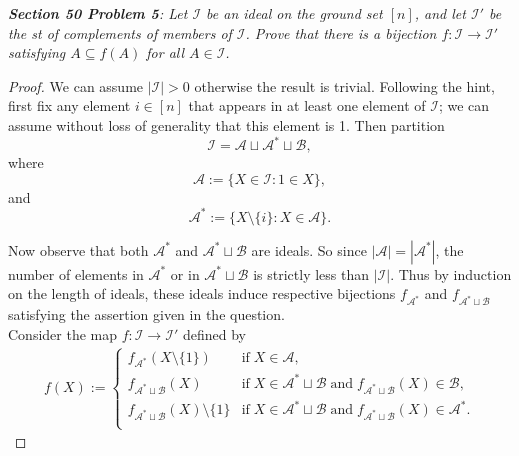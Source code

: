 \documentclass{article}
\begin{document}
\it \textbf{Section 50 Problem 5}: Let $\mathcal{I}$ be an ideal on the
  ground set $[n]$, and let $\mathcal{I}'$ be the st of complements of
  members of $\mathcal{I}$. Prove that there is a bijection
  $f:\mathcal{I}\rightarrow\mathcal{I}'$ satisfying $A\subseteq f(A)$ for
  all $A\in\mathcal{I}$.

  \begin{proof}
    We can assume $|\mathcal{I}|>0$ otherwise the result is trivial.
    Following the hint, first fix any element $i\in[n]$ that appears in at
    least one element of $\mathcal{I}$; we can assume without loss of
    generality that this element is 1. Then partition
    \[\mathcal{I}=\mathcal{A}\sqcup\mathcal{A}^*\sqcup\mathcal{B},\]
    where
    \[\mathcal{A} :=\{X\in\mathcal{I}: 1\in X\},\]
    and
    \[\mathcal{A}^* :=\{X\setminus\{i\}: X\in\mathcal{A}\}.\]

    Now observe that both $\mathcal{A}^*$ and
    $\mathcal{A}^*\sqcup\mathcal{B}$ are ideals. So since
    $|\mathcal{A}|=|\mathcal{A}^*|$, the number of elements in
    $\mathcal{A}^*$ or in $\mathcal{A}^*\sqcup\mathcal{B}$ is strictly less
    than $|\mathcal{I}|$. Thus by induction on the length of ideals, these
    ideals induce respective bijections $f_{\mathcal{A}^*}$ and
    $f_{\mathcal{A}^*\sqcup\mathcal{B}}$ satisfying the assertion given in
    the question. \\


    Consider the map $f:\mathcal{I}\rightarrow\mathcal{I}'$ defined by
    \begin{align*}
      f(X) :=
      \begin{cases}
        f_{\mathcal{A}^*}(X\setminus\{1\}) &\text{if}\; X\in \mathcal{A},\\
        f_{\mathcal{A}^*\sqcup\mathcal{B}}(X) &\text{if}\; X\in
          \mathcal{A}^*\sqcup\mathcal{B}\; \text{and}\;
          f_{\mathcal{A}^*\sqcup\mathcal{B}}(X) \in\mathcal{B},\\
        f_{\mathcal{A}^*\sqcup\mathcal{B}}(X)\setminus\{1\} &\text{if}\; X\in
          \mathcal{A}^*\sqcup\mathcal{B}\; \text{and}\;
          f_{\mathcal{A}^*\sqcup\mathcal{B}}(X) \in\mathcal{A}^*.\\
      \end{cases}
    \end{align*}
  \end{proof}
\end{document}

